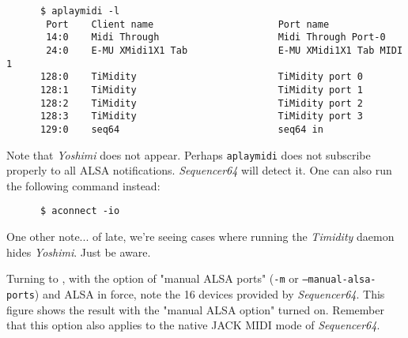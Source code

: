    \begin{verbatim}
      $ aplaymidi -l
       Port    Client name                      Port name
       14:0    Midi Through                     Midi Through Port-0
       24:0    E-MU XMidi1X1 Tab                E-MU XMidi1X1 Tab MIDI 1
      128:0    TiMidity                         TiMidity port 0
      128:1    TiMidity                         TiMidity port 1
      128:2    TiMidity                         TiMidity port 2
      128:3    TiMidity                         TiMidity port 3
      129:0    seq64                            seq64 in
   \end{verbatim}


   Note that \textsl{Yoshimi} does not appear.  Perhaps
   \texttt{aplaymidi} does not subscribe properly to all ALSA notifications.
   \textsl{Sequencer64} will detect it.
   One can also run the following command instead:

   \begin{verbatim}
      $ aconnect -io
   \end{verbatim}

   One other note... of late, we're seeing cases where running the
   \textsl{Timidity} daemon hides \textsl{Yoshimi}.  Just be aware.

%

   Turning to ,
   with the option of "manual ALSA ports" (\texttt{-m} or
   \texttt{--manual-alsa-ports}) and ALSA in force,
   note the 16 devices provided by \textsl{Sequencer64}.
   This figure shows the result with the "manual ALSA option" turned on.
   Remember that this option also applies to the native JACK MIDI
   mode of \textsl{Sequencer64}.


